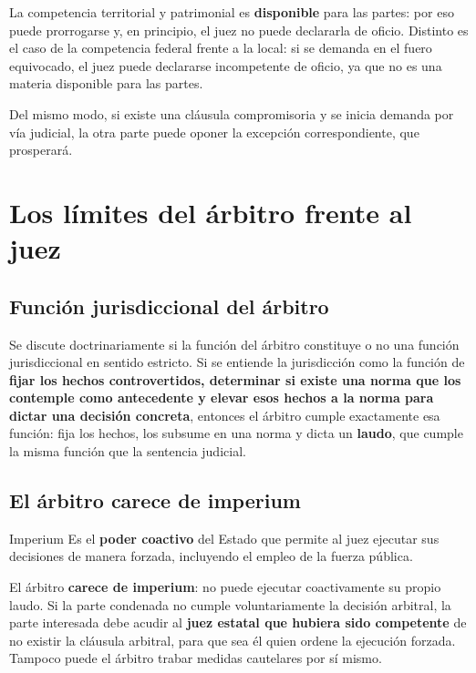 \documentclass[12pt,oneside]{book}
\begin{document}
\begin{note}
La competencia territorial y patrimonial es \textbf{disponible} para
las partes: por eso puede prorrogarse y, en principio, el juez no
puede declararla de oficio. Distinto es el caso de la competencia
federal frente a la local: si se demanda en el fuero equivocado, el
juez puede declararse incompetente de oficio, ya que no es una materia
disponible para las partes.

Del mismo modo, si existe una cláusula compromisoria y se inicia
demanda por vía judicial, la otra parte puede oponer la excepción
correspondiente, que prosperará.
\end{note}

\section{Los l\'imites del \'arbitro frente al juez}

\subsection{Funci\'on jurisdiccional del \'arbitro}

Se discute doctrinariamente si la función del árbitro constituye o no
una función jurisdiccional en sentido estricto. Si se entiende la
jurisdicción como la función de \textbf{fijar los hechos
controvertidos, determinar si existe una norma que los contemple como
antecedente y elevar esos hechos a la norma para dictar una decisión
concreta}, entonces el árbitro cumple exactamente esa función: fija los
hechos, los subsume en una norma y dicta un \textbf{laudo}, que cumple
la misma función que la sentencia judicial.

\subsection{El \'arbitro carece de imperium}

\begin{definition}{Imperium}
Es el \textbf{poder coactivo} del Estado que permite al juez ejecutar
sus decisiones de manera forzada, incluyendo el empleo de la fuerza
pública.
\end{definition}

\begin{important}
El árbitro \textbf{carece de imperium}: no puede ejecutar coactivamente
su propio laudo. Si la parte condenada no cumple voluntariamente la
decisión arbitral, la parte interesada debe acudir al \textbf{juez
estatal que hubiera sido competente} de no existir la cláusula arbitral,
para que sea él quien ordene la ejecución forzada. Tampoco puede el
árbitro trabar medidas cautelares por sí mismo.
\end{important}
\end{document}
